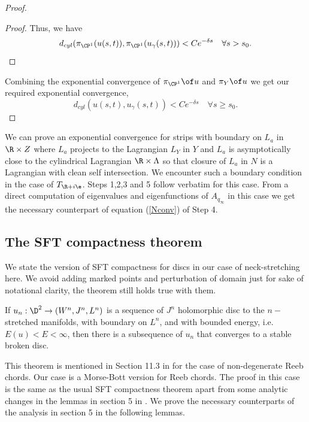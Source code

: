 \begin{proof}
\begin{proof}
\noindent Thus, we have $$d_{cyl} (\pi_{\CP^1} (u(s,t)),\pi_{\CP^1}(u_\gamma(s,t))) < Ce^{-\delta s} \quad  \forall s>s_0.$$



\end{proof}

\noindent Combining the exponential convergence of $\pi_{\CP^1} \of u$ and $\pi_Y \of u$ we get our required exponential convergence, $$d_{cyl}(u(s,t),u_\gamma(s,t)) < Ce^{-\delta s} \quad \forall s\geq s_0.$$


\end{proof}

\begin{remark}
\label{remark:asymptoticLagrangian}
We can prove an exponential convergence for strips with boundary on $L_a$ in $\R \times Z$ where $L_a$ projects to the Lagrangian $L_Y$ in $Y$ and $L_a$ is asymptotically close to the cylindrical Lagrangian $\R \times \Lambda$ so that closure of $L_a$ in $N$ is a Lagrangian with clean self intersection. We encounter such a boundary condition in the case of $T_{\R + i\e}$.  Steps 1,2,3  and 5 follow verbatim for this case. From a direct computation of eigenvalues and eigenfunctions of $A_{q_\infty}$ in this case we get the necessary counterpart of equation (\ref{Nconv}) of Step 4.  
\end{remark}

\subsection{The SFT compactness theorem}

We state the version of SFT compactness for discs in our case of neck-stretching here. We avoid adding marked points and perturbation of domain just for sake of notational clarity, the theorem still holds true with them.

\begin{Theorem} 
\label{theorem:SFTCompactness}
If $u_n : \D^2 \to (W^n,J^n,L^n) $ is a sequence of $J^n$ holomorphic disc to the $n-$stretched manifolds, with boundary on $L^n$, and with bounded energy, i.e. $E(u) < E< \infty$, then there is a subsequence of $u_n$ that converges to a stable broken disc.
\end{Theorem}

This theorem is mentioned in Section 11.3 in \cite{bhewz} for the case of non-degenerate Reeb chords. Our case is a Morse-Bott version for Reeb chords. The proof in this case is the same as the usual SFT compactness theorem apart from some analytic changes in the lemmas in section 5 in \cite{bhewz}. We prove the necessary counterparts of the analysis in section 5 in the following lemmas.

